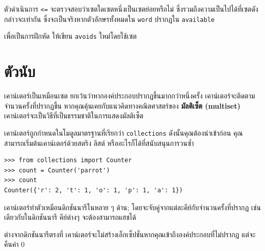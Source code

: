 ตัวดำเนินการ \verb"<=" จะตรวจสอบว่าเซตใดเซตหนึ่งเป็นเซตย่อยหรือไม่ ซึ่งรวมถึงความเป็นไปได้ที่เซตดังกล่าวจะเท่ากัน 
ซึ่งจะเป็นจริงหากตัวอักษรทั้งหมดใน {\tt word} ปรากฏใน {\tt available}

เพื่อเป็นการฝึกหัด ให้เขียน \verb"avoids" ใหม่โดยใช้เซต


\section{ตัวนับ} %

เคาน์เตอร์เป็นเหมือนเซต ยกเว้นว่าหากองค์ประกอบปรากฏขึ้นมากกว่าหนึ่งครั้ง เคาน์เตอร์จะติดตามจำนวนครั้งที่ปรากฏขึ้น 
หากคุณคุ้นเคยกับแนวคิดทางคณิตศาสตร์ของ {\bf มัลติเซ็ต (multiset)} เคาน์เตอร์จะเป็นวิธีที่เป็นธรรมชาติในการแสดงมัลติเซ็ต


เคาน์เตอร์ถูกกำหนดในโมดูลมาตรฐานที่เรียกว่า {\tt collections} ดังนั้นคุณต้องนำเข้าก่อน คุณสามารถเริ่มต้นเคาน์เตอร์ด้วยสตริง ลิสต์ หรืออะไรก็ได้ที่สนับสนุนการวนซ้ำ

\begin{verbatim}
>>> from collections import Counter
>>> count = Counter('parrot')
>>> count
Counter({'r': 2, 't': 1, 'o': 1, 'p': 1, 'a': 1})
\end{verbatim}

เคาน์เตอร์ทำตัวเหมือนดิกชันนารีในหลาย ๆ ด้าน; โดยจะจับคู่จากแต่ละคีย์กับจำนวนครั้งที่ปรากฏ เช่นเดียวกับในดิกชันนารี 
คีย์ต่างๆ จะต้องสามารถแฮชได้


ต่างจากดิกชันนารีตรงที่ เคาน์เตอร์จะไม่สร้างเอ็กเซ็ปชั่นหากคุณเข้าถึงองค์ประกอบที่ไม่ปรากฏ แต่จะคืนค่า 0

